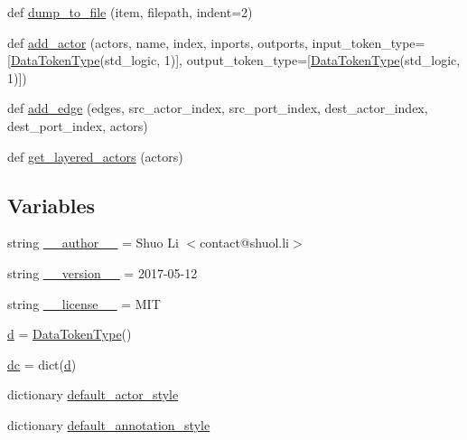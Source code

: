 \begin{DoxyCompactItemize}
\item 
def \hyperlink{namespacesylva_1_1base_1_1sdf_a55c1c6ea91b0ed9948ce670cd269b88b}{dump\+\_\+to\+\_\+file} (item, filepath, indent=2)
\item 
def \hyperlink{namespacesylva_1_1base_1_1sdf_a2fc075a9dc81209dee7a5b97d99640e5}{add\+\_\+actor} (actors, name, index, inports, outports, input\+\_\+token\+\_\+type=\mbox{[}\hyperlink{classsylva_1_1base_1_1sdf_1_1_data_token_type}{Data\+Token\+Type}(\textquotesingle{}std\+\_\+logic\textquotesingle{}, 1)\mbox{]}, output\+\_\+token\+\_\+type=\mbox{[}\hyperlink{classsylva_1_1base_1_1sdf_1_1_data_token_type}{Data\+Token\+Type}(\textquotesingle{}std\+\_\+logic\textquotesingle{}, 1)\mbox{]})
\item 
def \hyperlink{namespacesylva_1_1base_1_1sdf_aecda5e2c5810b35f98a0466a348af120}{add\+\_\+edge} (edges, src\+\_\+actor\+\_\+index, src\+\_\+port\+\_\+index, dest\+\_\+actor\+\_\+index, dest\+\_\+port\+\_\+index, actors)
\item 
def \hyperlink{namespacesylva_1_1base_1_1sdf_a1e0fb379d9b6a1f2adb650611bdb49e6}{get\+\_\+layered\+\_\+actors} (actors)
\end{DoxyCompactItemize}
\subsection*{Variables}
\begin{DoxyCompactItemize}
\item 
string \hyperlink{namespacesylva_1_1base_1_1sdf_acc6d2abcf12fe231ba37a00428ac6324}{\+\_\+\+\_\+author\+\_\+\+\_\+} = \textquotesingle{}Shuo Li $<$contact@shuol.\+li$>$\textquotesingle{}
\item 
string \hyperlink{namespacesylva_1_1base_1_1sdf_adccda126d39b0e5206af68035aea9066}{\+\_\+\+\_\+version\+\_\+\+\_\+} = \textquotesingle{}2017-\/05-\/12\textquotesingle{}
\item 
string \hyperlink{namespacesylva_1_1base_1_1sdf_a980e085a8798aeb5104490284de5edd1}{\+\_\+\+\_\+license\+\_\+\+\_\+} = \textquotesingle{}M\+IT\textquotesingle{}
\item 
\hyperlink{namespacesylva_1_1base_1_1sdf_a7cf3fa067b15b3a601f61564012ddaf1}{d} = \hyperlink{classsylva_1_1base_1_1sdf_1_1_data_token_type}{Data\+Token\+Type}()
\item 
\hyperlink{namespacesylva_1_1base_1_1sdf_a1e21c34d5788bcf15b3fb64cf5381843}{dc} = dict(\hyperlink{namespacesylva_1_1base_1_1sdf_a7cf3fa067b15b3a601f61564012ddaf1}{d})
\item 
dictionary \hyperlink{namespacesylva_1_1base_1_1sdf_a39d9eb96b3c8367d46f62630c694532a}{default\+\_\+actor\+\_\+style}
\item 
dictionary \hyperlink{namespacesylva_1_1base_1_1sdf_a2fc7e4f9875075ae2cc4d82650265733}{default\+\_\+annotation\+\_\+style}
\end{DoxyCompactItemize}


